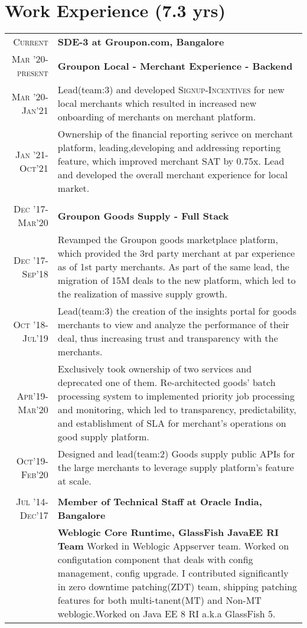 \documentclass[a4paper,10pt]{article}
\begin{document}
\section{Work Experience \normalsize(7.3 yrs)}
\begin{tabular}{rp{15cm}}
 \textsc{Current} & \textbf{SDE-3 at Groupon.com, Bangalore} \\
 \textsc{Mar '20-present}&\textbf{Groupon Local - Merchant Experience - Backend}\\ \small \textsc{ Mar '20-Jan'21}&\normalsize{Lead(team:3) and developed \textsc{Signup-Incentives} for new local merchants which resulted in increased new onboarding of merchants on merchant platform.}\\ \small \textsc{ Jan '21-Oct'21}&\normalsize{Ownership of the financial reporting serivce on merchant platform, leading,developing and addressing reporting feature, which improved merchant SAT by 0.75x. Lead and developed the overall merchant experience for local market.}\\ 
   \multicolumn{2}{c}{} \\
 \textsc{Dec '17-Mar'20}& \textbf{Groupon Goods Supply - Full Stack} \\ \small \textsc{Dec '17-Sep'18}&\normalsize{Revamped the Groupon goods marketplace platform, which provided the 3rd party merchant at par experience as of 1st party merchants. As part of the same lead, the migration of 15M deals to the new platform, which led to the realization of massive supply growth.} \\ \small \textsc{Oct '18-Jul'19}&\normalsize{Lead(team:3) the creation of the insights portal for goods merchants to view and analyze the performance of their deal, thus increasing trust and transparency with the merchants.} \\ \small \textsc{Apr'19-Mar'20}&\normalsize{Exclusively took ownership of two services and deprecated one of them. Re-architected goods' batch processing system to implemented priority job processing and monitoring, which led to transparency, predictability, and establishment of SLA for merchant's operations on good supply platform.}\\ \small \textsc{Oct'19-Feb'20}&\normalsize{Designed and lead(team:2) Goods supply public APIs for the large merchants to leverage supply platform's feature at scale.} \\
  \multicolumn{2}{c}{} \\
 \textsc{Jul '14-Dec'17}& \textbf{Member of Technical Staff at Oracle India, Bangalore}\\
 &\textbf{Weblogic Core Runtime, GlassFish JavaEE RI Team} \normalsize{Worked in Weblogic Appserver team. Worked on configutation component that deals with config management, config upgrade. I contributed significantly in zero downtime patching(ZDT) team, shipping patching features for both multi-tanent(MT) and Non-MT weblogic.Worked on Java EE 8 RI a.k.a GlassFish 5.}
\end{tabular}
\end{document}
